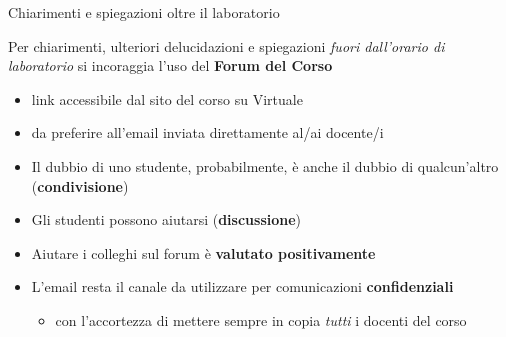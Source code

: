 \documentclass[xcolor=dvipsnames,presentation]{beamer}
\begin{document}


\begin{frame}{Chiarimenti e spiegazioni oltre il laboratorio}

Per chiarimenti, ulteriori delucidazioni e spiegazioni \emph{fuori dall'orario di laboratorio}
si incoraggia l'uso del \textbf{Forum del Corso}
\begin{itemize}
    \item link accessibile dal sito del corso su Virtuale
    \item da preferire all'email inviata direttamente al/ai docente/i
\end{itemize}

\begin{block}{}
    \begin{itemize}
        \item Il dubbio di uno studente, probabilmente, è anche il dubbio di qualcun'altro (\textbf{condivisione})
        \item Gli studenti possono aiutarsi (\textbf{discussione})
        \item Aiutare i colleghi sul forum è \textbf{valutato positivamente}
    \end{itemize}
\end{block}
\vfill
\begin{itemize}
\item L'email resta il canale da utilizzare per comunicazioni \textbf{confidenziali}
    \begin{itemize}
        \item con l'accortezza di mettere sempre in copia \emph{tutti} i docenti del corso
    \end{itemize}
\end{itemize}



\end{frame}
\end{document}

